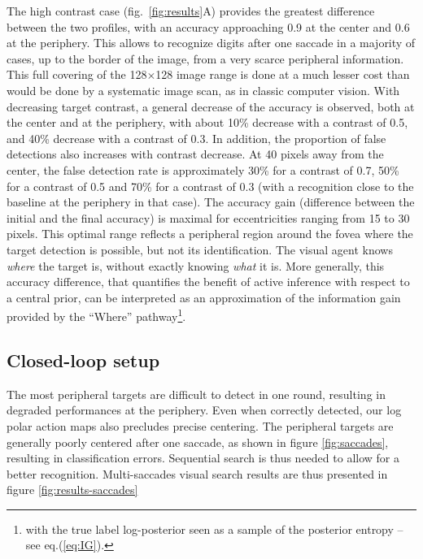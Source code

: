 The high contrast case (fig.~\ref{fig:results}A) provides the greatest difference between the two profiles, with an accuracy approaching 0.9 at the center and 0.6 at the periphery. This allows to recognize digits after one saccade in a majority of cases, up to the border of the image, from a very scarce peripheral information. This full covering of the 128$\times$128 image range is done at a much lesser cost than would be done by a systematic image scan, as in classic computer vision. With decreasing target contrast, a general decrease of the accuracy is observed, both at the center and at the periphery, with about 10\% decrease with a contrast of 0.5, and 40\% decrease with a contrast of 0.3. In addition, the proportion of false detections also increases with contrast decrease. At 40 pixels away from the center, the false detection rate is approximately 30\% for a contrast of 0.7, 50\% for a contrast of 0.5 and 70\% for a contrast of 0.3 (with a recognition close to the baseline at the periphery in that case). The accuracy gain (difference between the initial and the final accuracy) is maximal for eccentricities ranging from 15 to 30 pixels. This optimal range reflects a peripheral region around the fovea where the target detection is possible, but not its identification. The visual agent knows \emph{where} the target is, without exactly knowing \emph{what} it is. 
More generally, this accuracy difference, that quantifies the benefit of active inference with respect to a central prior, can be interpreted as an approximation of the information gain provided by the ``Where'' pathway\footnote{with the true label log-posterior seen as a sample of the posterior entropy -- see eq.(\ref{eq:IG}).}.





\subsection*{Closed-loop setup}

The most peripheral targets are difficult to detect in one round, resulting in degraded performances at the periphery. Even when correctly detected, our log polar action maps also precludes precise centering. The peripheral targets are generally poorly centered after one saccade, as shown in figure \ref{fig:saccades}, resulting in classification errors. Sequential search is thus needed to allow for a better recognition. Multi-saccades visual search results are thus presented in figure \ref{fig:results-saccades} 


